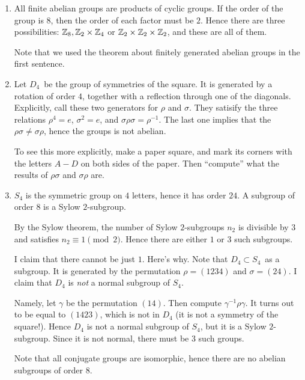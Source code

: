 \documentclass[11pt, english]{article}
\begin{document}
\begin{sol}
\begin{enumerate}
	\item All finite abelian groups are products of cyclic groups. If the order of the group is $8$, then the order of each factor must be $2$. Hence there are three possibilities: $\mathbb{Z}_8, \mathbb{Z}_2 \times \mathbb{Z}_4$ or $\mathbb{Z}_2 \times \mathbb{Z}_2 \times \mathbb{Z}_2$, and these are all of them.

	Note that we used the theorem about finitely generated abelian groups in the first sentence.
	\item Let $D_4$ be the group of symmetries of the square. It is generated by a rotation of order $4$, together with a reflection through one of the diagonals. Explicitly, call these two generators for $\rho$ and $\sigma$. They satisify the three relations $\rho^4=e$, $\sigma^2=e$, and $\sigma \rho \sigma = \rho^{-1}$. The last one implies that the $\rho \sigma \neq \sigma \rho$, hence the groups is not abelian.

	To see this more explicitly, make a paper square, and mark its corners with the letters $A-D$ on both sides of the paper. Then ``compute'' what the results of $\rho \sigma$ and $\sigma \rho$ are.
	\item $S_4$ is the symmetric group on $4$ letters, hence it has order $24$. A subgroup of order $8$ is a Sylow $2$-subgroup. 

	By the Sylow theorem, the number of Sylow $2$-subgroups $n_2$ is divisible by $3$ and satisfies $n_2 \equiv 1 \pmod 2$. Hence there are either $1$ or $3$ such subgroups.

	I claim that there cannot be just $1$. Here's why. Note that $D_4 \subset S_4$ as a subgroup. It is generated by the permutation $\rho=(1234)$ and $\sigma=(24)$. I claim that $D_4$ is \emph{not} a normal subgroup of $S_4$.

	Namely, let $\gamma$ be the permutation $(14)$. Then compute $\gamma^{-1}\rho \gamma$. It turns out to be equal to $(1423)$, which is not in $D_4$ (it is not a symmetry of the square!). Hence $D_4$ is not a normal subgroup of $S_4$, but it is a Sylow $2$-subgroup. Since it is not normal, there must be $3$ such groups.

	Note that all conjugate groups are isomorphic, hence there are no abelian subgroups of order $8$.
\end{enumerate}
\end{sol}
\end{document}

